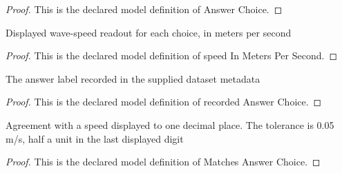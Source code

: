 \begin{proof}
  This is the declared model definition of Answer Choice.
\end{proof}
\begin{definition}
  \label{def:physics:phyx-mini-0292:phyxminiproblems-problemphyxmini0292-answerchoice-speedinmeterspersecond}
  Displayed wave-speed readout for each choice, in meters per second
\end{definition}
\begin{proof}
  This is the declared model definition of speed In Meters Per Second.
\end{proof}
\begin{definition}
  \label{def:physics:phyx-mini-0292:phyxminiproblems-problemphyxmini0292-recordedanswerchoice}
  The answer label recorded in the supplied dataset metadata
\end{definition}
\begin{proof}
  This is the declared model definition of recorded Answer Choice.
\end{proof}
\begin{definition}
  \label{def:physics:phyx-mini-0292:phyxminiproblems-problemphyxmini0292-matchesanswerchoice}
  Agreement with a speed displayed to one decimal place. The tolerance is 0.05 m/s, half a unit in the last displayed digit
\end{definition}
\begin{proof}
  This is the declared model definition of Matches Answer Choice.
\end{proof}
